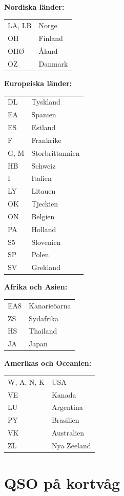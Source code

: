 \textbf{Nordiska länder:}

\begin{tabular}{ll}
  LA, LB & Norge\\
  OH & Finland\\
  OHØ & Åland\\
  OZ & Danmark\\
\end{tabular}

\textbf{Europeiska länder:}

\begin{tabular}{ll}
  DL & Tyskland\\
  EA & Spanien\\
  ES & Estland\\
  F & Frankrike\\
  G, M & Storbrittannien\\
  HB & Schweiz\\
  I & Italien\\
  LY & Litauen\\
  OK & Tjeckien\\
  ON & Belgien\\
  PA & Holland\\
  S5 & Slovenien\\
  SP & Polen\\
  SV & Grekland\\
\end{tabular}

\textbf{Afrika och Asien:}

\begin{tabular}{ll}
  EA8 & Kanarieöarna\\
  ZS & Sydafrika\\
  HS & Thailand\\
  JA & Japan\\
\end{tabular}

\textbf{Amerikas och Oceanien:}
    
\begin{tabular}{ll}
  W, A, N, K & USA\\
  VE & Kanada\\
  LU & Argentina\\
  PY & Brasilien\\
  VK & Australien\\
  ZL & Nya Zeeland\\
\end{tabular}

\newpage

\section{QSO på kortvåg}

